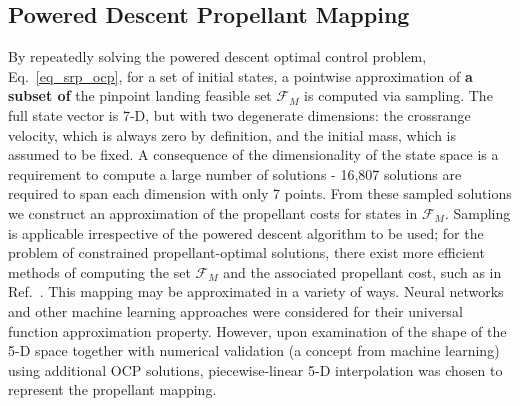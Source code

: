 \documentclass[letterpaper, preprint, paper,11pt]{AAS}
\begin{document}
\subsection{Powered Descent Propellant Mapping}
By repeatedly solving the powered descent optimal control problem, Eq.~\ref{eq_srp_ocp}, for a set of initial states, a pointwise approximation of \textbf{a subset of} the pinpoint landing feasible set $\mathcal{F}_M$ is computed via sampling. The full state vector is 7-D, but with two degenerate dimensions: the crossrange velocity, which is always zero by definition, and the initial mass, which is assumed to be fixed. A consequence of the dimensionality of the state space is a requirement to compute a large number of solutions -  16,807 solutions are required to span each dimension with only 7 points. From these sampled solutions we construct an approximation of the propellant costs for states in $\mathcal{F}_M$. Sampling is applicable irrespective of the powered descent algorithm to be used; for the problem of constrained propellant-optimal solutions, there exist more efficient methods of computing the set $\mathcal{F}_M$ and the associated propellant cost, such as in Ref.~\cite{SRP_ControllableSets}.
This mapping may be approximated in a variety of ways. Neural networks and other machine learning approaches were considered for their universal function approximation property. However, upon examination of the shape of the 5-D space together with numerical validation (a concept from machine learning) using additional OCP solutions, piecewise-linear 5-D interpolation was chosen to represent the propellant mapping.



 
\end{document}
